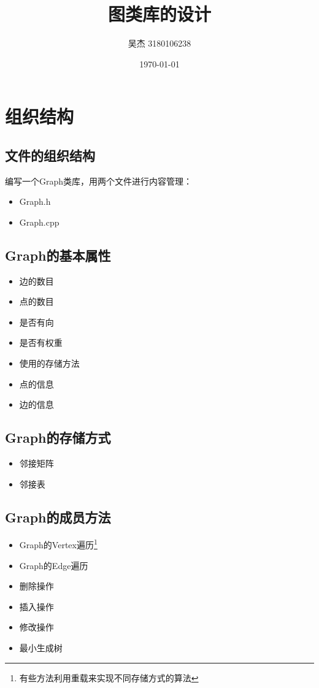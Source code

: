 \documentclass{article}
\title{图类库的设计}
{}\author{吴杰 3180106238}
\date{\today}
\begin{document}
\maketitle

\section{组织结构}
\subsection{文件的组织结构}
编写一个Graph类库，用两个文件进行内容管理：
\begin{itemize}
	\item Graph.h
	\item Graph.cpp
\end{itemize}

\subsection{Graph的基本属性}
\begin{itemize}
	\item 边的数目
	\item 点的数目
	\item 是否有向
	\item 是否有权重
	\item 使用的存储方法
	\item 点的信息
	\item 边的信息
\end{itemize}

\subsection{Graph的存储方式}
\begin{itemize}
	\item 邻接矩阵
	\item 邻接表
\end{itemize}

\subsection{Graph的成员方法}
\begin{itemize}
	\item Graph的Vertex遍历\footnote{有些方法利用重载来实现不同存储方式的算法}
	\item Graph的Edge遍历
	\item 删除操作
	\item 插入操作
	\item 修改操作
	\item 最小生成树
\end{itemize}
\end{document}

